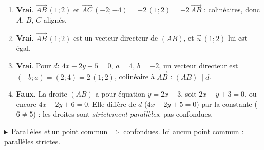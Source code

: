 \documentclass[11pt,a4paper]{article}
\newcommand{\vc}[1]{\overrightarrow{#1}}
\newcommand{\cor}[1]{\medskip\noindent{\color{primarydark}\bfseries\large Corrigé #1.}\par\smallskip}
\newcommand{\rep}{\textcolor{excol}{$\blacktriangleright$}\ }
\begin{document}
\cor{4}
\begin{enumerate}[label=\textbf{\Alph*.},leftmargin=2.2em,itemsep=3pt]
  \item \textbf{Vrai}. $\vc{AB}\,(1;2)$ et $\vc{AC}\,(-2;-4)=-2\,(1;2)=-2\,\vc{AB}$ : colinéaires, donc
        $A$, $B$, $C$ alignés.
  \item \textbf{Vrai}. $\vc{AB}\,(1;2)$ est un vecteur directeur de $(AB)$, et $\vec u\,(1;2)$ lui est
        égal.
  \item \textbf{Vrai}. Pour $d:\ 4x-2y+5=0$, $a=4$, $b=-2$, un vecteur directeur est
        $(-b;a)=(2;4)=2\,(1;2)$, colinéaire à $\vc{AB}$ : $(AB)\parallel d$.
  \item \textbf{Faux}. La droite $(AB)$ a pour équation $y=2x+3$, soit $2x-y+3=0$, ou encore
        $4x-2y+6=0$. Elle diffère de $d$ ($4x-2y+5=0$) par la constante ($6\neq5$) : les droites sont
        \emph{strictement parallèles}, pas confondues.
\end{enumerate}
\rep Parallèles \emph{et} un point commun $\Rightarrow$ confondues. Ici aucun point commun : parallèles
strictes.
\end{document}
